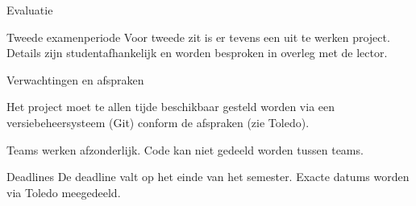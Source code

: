 \documentclass{studiewijzer}
\begin{document}
\begin{categorybox}{Evaluatie}
    \begin{category}{Tweede examenperiode}
        Voor tweede zit is er tevens een uit te werken project.
        Details zijn studentafhankelijk en worden besproken in overleg met de lector.
    \end{category}

    \begin{category}{Verwachtingen en afspraken}
        \begin{items}
            \item Het project moet te allen tijde beschikbaar gesteld worden via een versiebeheersysteem (Git) conform de afspraken (zie Toledo).
            \item Teams werken afzonderlijk. Code kan niet gedeeld worden tussen teams.
        \end{items}
    \end{category}

    \begin{category}{Deadlines}
        De deadline valt op het einde van het semester. Exacte datums worden via Toledo meegedeeld.
    \end{category}
\end{categorybox}
\end{document}

